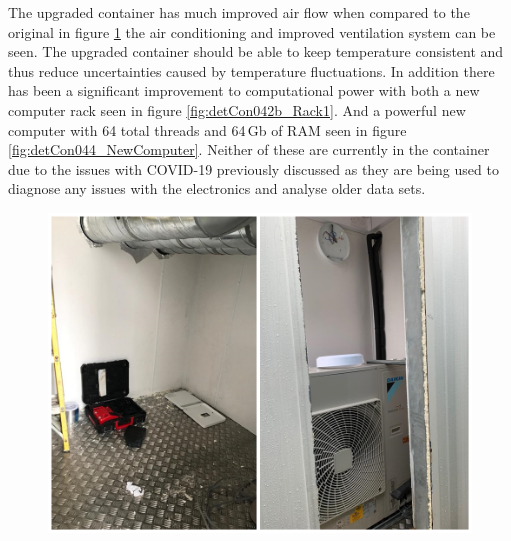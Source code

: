 The upgraded container has much improved air flow when compared to the original in figure  \ref{fig:detCon035b_ContainerAirCon} the air conditioning and improved ventilation system can be seen. The upgraded container should be able to keep temperature consistent and thus reduce uncertainties caused by temperature fluctuations. In addition there has been a significant improvement to computational power with both a new computer rack seen in figure \ref{fig:detCon042b_Rack1}. And a powerful new computer with 64 total threads and 64\,Gb of RAM seen in figure \ref{fig:detCon044_NewComputer}. Neither of these are currently in the container due to the issues with COVID-19 previously discussed as they are being used to diagnose any issues with the electronics and analyse older data sets.  

\begin{figure}[htbp]
\centering
\includegraphics[width=0.7\linewidth]{Chapter3/Figs/Raster/detCon035b_ContainerAirCon.png}
\label{fig:detCon035b_ContainerAirCon}
\end{figure}



